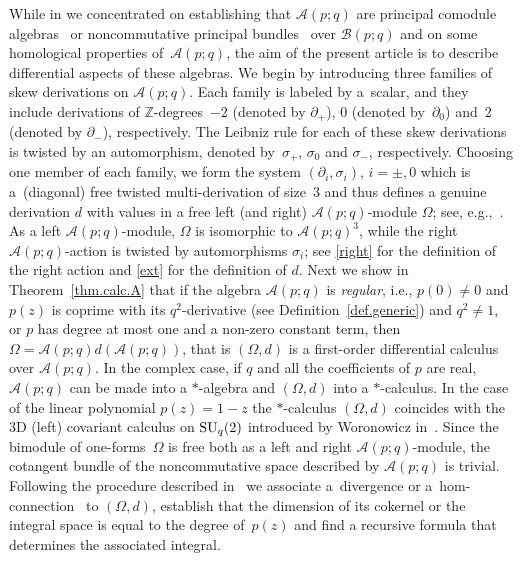 \documentclass[pdftex]{sigma}
\numberwithin{equation}{section}
\def\Weyl#1#2{{\mathcal{B}}(#1;#2)}
\def\AWeyl#1#2{{\mathcal{A}}(#1;#2)}
\begin{document}
While in \cite{Brz:gen} we concentrated on establishing that $\AWeyl p q$ are principal comodule algebras~\cite{BrzHaj:Che} or noncommutative principal bundles~\cite{BrzMaj:gau} over $\Weyl p q$ and on some homological properties of~$\AWeyl p q$, the aim of the present article is to describe dif\/ferential aspects of these algebras. We begin by introducing three families of skew derivations on $\AWeyl p q$. Each family is labeled by a~scalar, and they include derivations of ${\mathbb Z}$-degrees~$-2$ (denoted by $\partial_+$), $0$ (denoted by~$\partial_0$) and~$2$ (denoted by $\partial_-$), respectively. The Leibniz rule for each of these skew derivations is twisted by an automorphism, denoted by~$\sigma_+$, $\sigma_0$ and $\sigma_-$, respectively. Choosing one member of each family, we form the system $(\partial_i,\sigma_i)$, $i=\pm, 0$ which is a~(diagonal) free twisted multi-derivation of size~3 and thus def\/ines a genuine derivation $d$ with values in a free left (and right) $\AWeyl p q$-module $\Omega$; see, e.g.,~\cite{BrzElK:int}. As a left $\AWeyl p q$-module, $\Omega$ is isomorphic to $\AWeyl p q^3$, while the right $\AWeyl p q$-action is twisted by automorphisms $\sigma_i$; see \eqref{right} for the def\/inition of the right action and \eqref{ext} for the def\/inition of $d$. Next we show in Theorem~\ref{thm.calc.A} that if the algebra $\AWeyl p q$ is {\em regular}, i.e., $p(0) \neq 0$ and $p(z)$ is coprime with its $q^2$-derivative (see Def\/inition~\ref{def.generic}) and $q^2\neq 1$, or $p$ has degree at most one and a non-zero constant term, then $\Omega = \AWeyl p q d\left(\AWeyl p q\right)$, that is $(\Omega, d)$ is a f\/irst-order dif\/ferential calculus over $\AWeyl p q$. In the complex case, if $q$ and all the coef\/f\/icients of $p$ are real, $\AWeyl p q$ can be made into a $*$-algebra and $(\Omega, d)$ into a $*$-calculus. In the case of the linear polynomial $p(z) = 1-z$ the $*$-calculus $(\Omega, d)$ coincides with the 3D (left) covariant calculus on ${\rm SU}_q(2)$ introduced by Woronowicz in~\cite{Wor:twi}. Since the bimodule of one-forms~$\Omega$ is free both as a left and right $\AWeyl p q$-module, the cotangent bundle of the noncommutative space described by $\AWeyl p q$ is trivial. Following the procedure described in~\cite{BrzElK:int} we associate a~divergence or a~hom-connection~\cite{Brz:con} to $(\Omega, d)$, establish that the dimension of its cokernel or the integral space is equal to the degree of~$p(z)$ and f\/ind a recursive formula that determines the associated integral.
\end{document}
